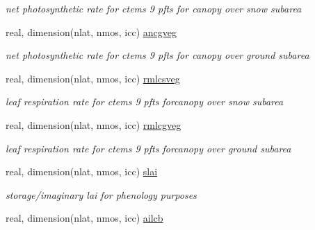 \begin{DoxyCompactItemize}
\begin{DoxyCompactList}\small\item\em net photosynthetic rate for ctems 9 pfts for canopy over snow subarea \end{DoxyCompactList}\item 
\hypertarget{structctem__statevars_1_1veg__rot_a9963cdb505d6554825b00a64ab4cbeaf}{}real, dimension(nlat, nmos, icc) \hyperlink{structctem__statevars_1_1veg__rot_a9963cdb505d6554825b00a64ab4cbeaf}{ancgveg}\label{structctem__statevars_1_1veg__rot_a9963cdb505d6554825b00a64ab4cbeaf}

\begin{DoxyCompactList}\small\item\em net photosynthetic rate for ctems 9 pfts for canopy over ground subarea \end{DoxyCompactList}\item 
\hypertarget{structctem__statevars_1_1veg__rot_acc4da954bb1531f6c7ce0427f6e8cc21}{}real, dimension(nlat, nmos, icc) \hyperlink{structctem__statevars_1_1veg__rot_acc4da954bb1531f6c7ce0427f6e8cc21}{rmlcsveg}\label{structctem__statevars_1_1veg__rot_acc4da954bb1531f6c7ce0427f6e8cc21}

\begin{DoxyCompactList}\small\item\em leaf respiration rate for ctems 9 pfts forcanopy over snow subarea \end{DoxyCompactList}\item 
\hypertarget{structctem__statevars_1_1veg__rot_a0d1a5abf2370c25e7daeef98aba5326c}{}real, dimension(nlat, nmos, icc) \hyperlink{structctem__statevars_1_1veg__rot_a0d1a5abf2370c25e7daeef98aba5326c}{rmlcgveg}\label{structctem__statevars_1_1veg__rot_a0d1a5abf2370c25e7daeef98aba5326c}

\begin{DoxyCompactList}\small\item\em leaf respiration rate for ctems 9 pfts forcanopy over ground subarea \end{DoxyCompactList}\item 
\hypertarget{structctem__statevars_1_1veg__rot_a2eb04fa664a52dbeea9f0725f7697e8b}{}real, dimension(nlat, nmos, icc) \hyperlink{structctem__statevars_1_1veg__rot_a2eb04fa664a52dbeea9f0725f7697e8b}{slai}\label{structctem__statevars_1_1veg__rot_a2eb04fa664a52dbeea9f0725f7697e8b}

\begin{DoxyCompactList}\small\item\em storage/imaginary lai for phenology purposes \end{DoxyCompactList}\item 
\hypertarget{structctem__statevars_1_1veg__rot_a1c0fc57d3d52b8175a8b13b28098a8fd}{}real, dimension(nlat, nmos, icc) \hyperlink{structctem__statevars_1_1veg__rot_a1c0fc57d3d52b8175a8b13b28098a8fd}{ailcb}\label{structctem__statevars_1_1veg__rot_a1c0fc57d3d52b8175a8b13b28098a8fd}


\end{DoxyCompactItemize}
